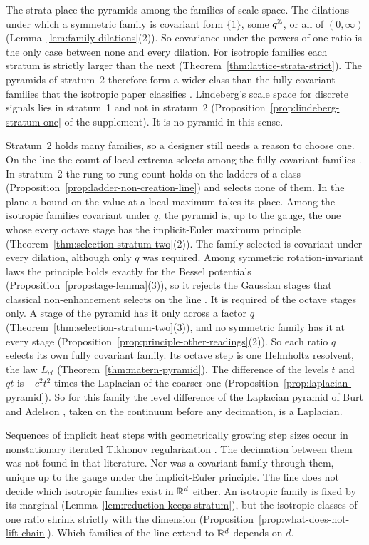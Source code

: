 The strata place the pyramids among the families of scale space. The dilations under which a
symmetric family is covariant form $\{1\}$, some $q^{\mathbb{Z}}$, or all of $(0,\infty)$
(Lemma~\ref{lem:family-dilations}(2)). So covariance under the powers of one ratio is the only case
between none and every dilation. For isotropic families each stratum is strictly larger than the
next (Theorem~\ref{thm:lattice-strata-strict}). The pyramids of stratum~2 therefore form a wider
class than the fully covariant families that the isotropic paper classifies
. Lindeberg's scale space for discrete signals
\cite{lindeberg1990scalespace} lies in stratum~1 and not in stratum~2
(Proposition~\ref{prop:lindeberg-stratum-one} of the supplement). It is no pyramid in this sense.

Stratum~2 holds many families, so a designer still needs a reason to choose one. On the line the
count of local extrema selects among the fully covariant families .
In stratum~2 the rung-to-rung count holds on the ladders of a class
(Proposition~\ref{prop:ladder-non-creation-line}) and selects none of them. In the plane a bound on
the value at a local maximum takes its place. Among the isotropic families covariant under $q$, the
\Matern{} pyramid is, up to the gauge, the one whose every octave stage has the implicit-Euler
maximum principle (Theorem~\ref{thm:selection-stratum-two}(2)). The family selected is covariant
under every dilation, although only $q$ was required. Among symmetric rotation-invariant laws the
principle holds exactly for the Bessel potentials (Proposition~\ref{prop:stage-lemma}(3)), so it
rejects the Gaussian stages that classical non-enhancement selects on the line
. It is required of the octave stages only. A stage of
the \Matern{} pyramid has it only across a factor $q$ (Theorem~\ref{thm:selection-stratum-two}(3)),
and no symmetric family has it at every stage
(Proposition~\ref{prop:principle-other-readings}(2)). So each ratio $q$ selects its own fully
covariant family. Its octave step is one Helmholtz
resolvent, the law $L_{ct}$ (Theorem~\ref{thm:matern-pyramid}). The difference of the levels $t$
and $qt$ is $-c^2t^2$ times the Laplacian of the coarser one
(Proposition~\ref{prop:laplacian-pyramid}). So for this family the level difference of the
Laplacian pyramid of Burt and Adelson \cite[p.~535]{burt1983laplacian}, taken on the continuum before any
decimation, is a Laplacian.

Sequences of implicit heat steps with geometrically growing step sizes occur in nonstationary
iterated Tikhonov regularization \cite[pp.~38--39]{hanke1998nonstationary}. The decimation between
them was not found in that literature. Nor was a covariant family through them, unique up to the
gauge under the implicit-Euler principle. The line does not decide which isotropic families exist
in $\mathbb{R}^d$ either. An isotropic family is fixed by its marginal (Lemma~\ref{lem:reduction-keeps-stratum}), but the
isotropic classes of one ratio shrink strictly with the dimension
(Proposition~\ref{prop:what-does-not-lift-chain}). Which families of the line extend to $\mathbb{R}^d$
depends on $d$.

